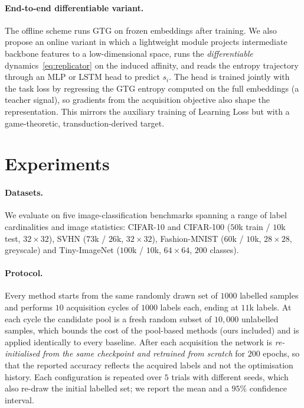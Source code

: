 \documentclass[11pt]{article}
\begin{document}
\paragraph{End-to-end differentiable variant.} The offline scheme runs GTG on
frozen embeddings after training. We also propose an online variant in which a
lightweight module projects intermediate backbone features to a low-dimensional
space, runs the \emph{differentiable} dynamics~\eqref{eq:replicator} on the induced
affinity, and reads the entropy trajectory through an MLP or LSTM head to predict
$s_i$. The head is trained jointly with the task loss by regressing the GTG entropy
computed on the full embeddings (a teacher signal), so gradients from the
acquisition objective also shape the representation. This mirrors the auxiliary
training of Learning Loss \citep{yoo2019learning} but with a game-theoretic,
transduction-derived target. %

\section{Experiments}

\paragraph{Datasets.} We evaluate on five image-classification benchmarks spanning a range
of label cardinalities and image statistics: CIFAR-10 and CIFAR-100 ($50$k train
/ $10$k test, $32\times32$), SVHN ($73$k / $26$k, $32\times32$), Fashion-MNIST
($60$k / $10$k, $28\times28$, greyscale) and Tiny-ImageNet ($100$k / $10$k, $64\times64$,
$200$ classes).

\paragraph{Protocol.} Every method starts from the same randomly drawn set of $1000$
labelled samples and performs $10$ acquisition cycles of $1000$ labels each, ending at
$11$k labels. At each cycle the candidate pool is a fresh random subset of $10{,}000$
unlabelled samples, which bounds the cost of the pool-based methods (ours included) and is
applied identically to every baseline. After each acquisition the network is
\emph{re-initialised from the same checkpoint and retrained from scratch} for $200$ epochs,
so that the reported accuracy reflects the acquired labels and not the optimisation history.
Each configuration is repeated over $5$ trials with different seeds, which also re-draw the
initial labelled set; we report the mean and a $95\%$ confidence interval.
\end{document}
